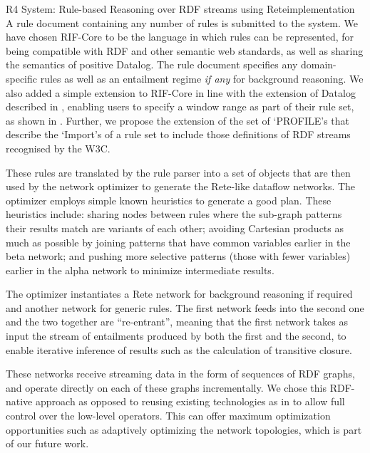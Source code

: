 \begin{nestedsection}{R4 System: Rule-based Reasoning over RDF streams using Rete}{implementation}
	A rule document containing any number of rules is submitted to the system.
	We have chosen RIF-Core to be the language in which rules can be represented, for being compatible with RDF and other semantic web standards, as well as sharing the semantics of positive Datalog.
	The rule document specifies any domain-specific rules as well as an entailment regime \emph{if any} for background reasoning.
	We also added a simple extension to RIF-Core in line with the extension of Datalog described in , enabling users to specify a window range as part of their rule set, as shown in .
	Further, we propose the extension of the set of `PROFILE's that describe the `Import's of a rule set to include those definitions of RDF streams recognised by the W3C.

	These rules are translated by the rule parser into a set of objects that are then used by the network optimizer to generate the Rete-like dataflow networks.
	The optimizer employs simple known heuristics to generate a good plan.
	These heuristics include: sharing nodes between rules where the sub-graph patterns their results match are variants of each other; avoiding Cartesian products as much as possible by joining patterns that have common variables earlier in the beta network; and pushing more selective patterns (those with fewer variables) earlier in the alpha network to minimize intermediate results.
	
	The optimizer instantiates a Rete network for background reasoning if required and another network for generic rules.
	The first network feeds into the second one and the two together are ``re-entrant'', meaning that the first network takes as input the stream of entailments produced by both the first and the second, to enable iterative inference of results such as the calculation of transitive closure.
	
	These networks receive streaming data in the form of sequences of RDF graphs, and operate directly on each of these graphs incrementally.
	We chose this RDF-native approach as opposed to reusing existing technologies as in \citep{C-SPARQL,streaming-sparql} to allow full control over the low-level operators.
	This can offer maximum optimization opportunities such as adaptively optimizing the network topologies, which is part of our future work.


\end{nestedsection}
